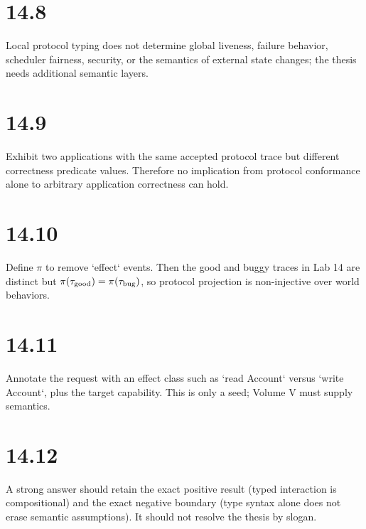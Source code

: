 \section*{14.8}
Local protocol typing does not determine global liveness, failure behavior, scheduler fairness, security, or the semantics of external state changes; the thesis needs additional semantic layers.

\section*{14.9}
Exhibit two applications with the same accepted protocol trace but different correctness predicate values. Therefore no implication from protocol conformance alone to arbitrary application correctness can hold.

\section*{14.10}
Define $\pi$ to remove `effect` events. Then the good and buggy traces in Lab 14 are distinct but $\pi(\tau_{\rm good})=\pi(\tau_{\rm bug})$, so protocol projection is non-injective over world behaviors.

\section*{14.11}
Annotate the request with an effect class such as `read Account` versus `write Account`, plus the target capability. This is only a seed; Volume V must supply semantics.

\section*{14.12}
A strong answer should retain the exact positive result (typed interaction is compositional) and the exact negative boundary (type syntax alone does not erase semantic assumptions). It should not resolve the thesis by slogan.
